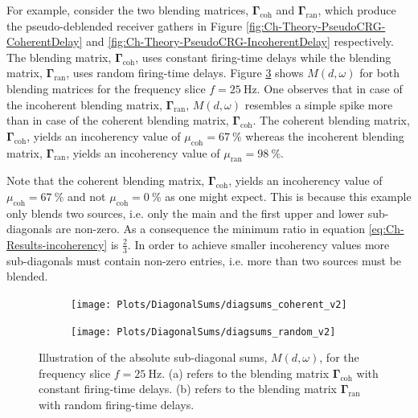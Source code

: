 For example, consider the two blending matrices, $\mathbf{\Gamma}_{\mathrm{coh}}$ and $\mathbf{\Gamma}_{\mathrm{ran}}$, which produce the pseudo-deblended receiver gathers in Figure \ref{fig:Ch-Theory-PseudoCRG-CoherentDelay} and \ref{fig:Ch-Theory-PseudoCRG-IncoherentDelay} respectively. The blending matrix, $\mathbf{\Gamma}_{\mathrm{coh}}$, uses constant firing-time delays while the blending matrix, $\mathbf{\Gamma}_{\mathrm{ran}}$, uses random firing-time delays. Figure \ref{fig:Ch-Incoherency-Coh-vs-Ran-Diag} shows $M(d,\omega)$ for both blending matrices for the frequency slice $f=\SI{25}{\hertz}$. One observes that in case of the incoherent blending matrix, $\mathbf{\Gamma}_{\mathrm{ran}}$, $M(d,\omega)$ resembles a simple spike more than in case of the coherent blending matrix, $\mathbf{\Gamma}_{\mathrm{coh}}$. The coherent blending matrix, $\mathbf{\Gamma}_{\mathrm{coh}}$,  yields an incoherency value of $\mu_{\mathrm{coh}} = \SI{67}{\percent}$ whereas the incoherent blending matrix, $\mathbf{\Gamma}_{\mathrm{ran}}$, yields an incoherency value of $\mu_{\mathrm{ran}} = \SI{98}{\percent}$. 

Note that the coherent blending matrix, $\mathbf{\Gamma}_{\mathrm{coh}}$, yields an incoherency value of $\mu_{\mathrm{coh}} = \SI{67}{\percent}$ and not $\mu_{\mathrm{coh}} = \SI{0}{\percent}$ as one might expect. This is because this example only blends two sources, i.e. only the main and the first upper and lower sub-diagonals are non-zero. As a consequence the minimum ratio in equation \ref{eq:Ch-Results-incoherency} is $\frac{2}{3}$. In order to achieve smaller incoherency values more sub-diagonals must contain non-zero entries, i.e. more than two sources must be blended.

\begin{figure}
	
	\centering
	\begin{subfigure}[b]{0.45\textwidth}
	\centering
	\texttt{[image: Plots/DiagonalSums/diagsums\_coherent\_v2]}	
	\caption{}
	\label{fig:Ch-Incoherency-CoherentDiag}	
	\end{subfigure}
	\centering
	\begin{subfigure}[b]{0.45\textwidth}
	\centering
	\texttt{[image: Plots/DiagonalSums/diagsums\_random\_v2]}	
	\caption{}
	\label{fig:Ch-Incoherency-RandomDiag}	
	\end{subfigure}
	
	\caption{Illustration of the absolute sub-diagonal sums, $M(d,\omega)$, for the frequency slice $f=\SI{25}{\hertz}$. (a) refers to the blending matrix $\mathbf{\Gamma}_{\mathrm{coh}}$ with constant firing-time delays.  (b) refers to the blending matrix $\mathbf{\Gamma}_{\mathrm{ran}}$ with random firing-time delays.}
	\label{fig:Ch-Incoherency-Coh-vs-Ran-Diag}
	
\end{figure}


